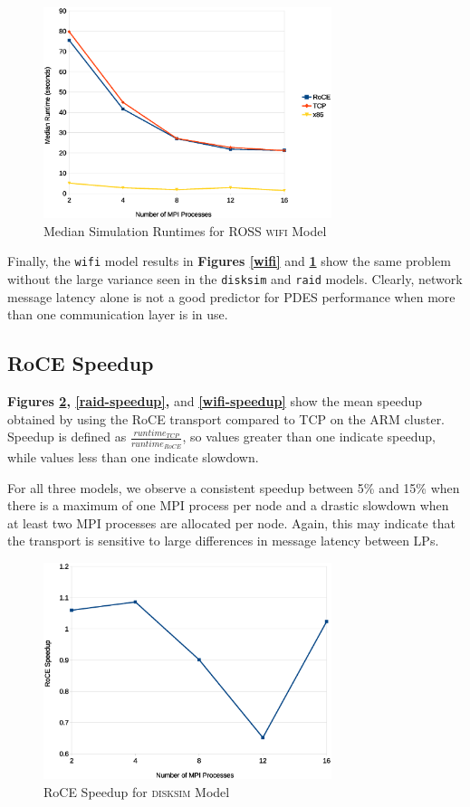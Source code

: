 \documentclass[11pt]{book}
\begin{document}
\begin{figure}
\centering
\includegraphics[width=0.75\textwidth]{wifi_median}
\caption{Median Simulation Runtimes for ROSS \textsc{wifi} Model}
\label{wifi-median}
\end{figure}

Finally, the \verb;wifi; model results in \textbf{Figures \ref{wifi}} and
\textbf{\ref{wifi-median}} show the same problem without the large variance seen
in the \verb;disksim; and \verb;raid; models. Clearly, network message latency
alone is not a good predictor for PDES performance when more than one
communication layer is in use.


\subsection{\textbf{RoCE Speedup}}

\textbf{Figures \ref{disksim-speedup}, \ref{raid-speedup},} and
\textbf{\ref{wifi-speedup}} show the mean speedup obtained by using the RoCE
transport compared to TCP on the ARM cluster. Speedup is defined as
$\frac{runtime_{TCP}}{runtime_{RoCE}}$, so values greater than one indicate speedup,
while values less than one indicate slowdown.

For all three models, we observe a consistent speedup between 5\% and 15\% when
there is a maximum of one MPI process per node and a drastic slowdown when
at least two MPI processes are allocated per node. Again, this may indicate that
the transport is sensitive to large differences in message latency between LPs.

\begin{figure}
\centering
\includegraphics[width=0.75\textwidth]{disksim_speedup}
\caption{RoCE Speedup for \textsc{disksim} Model}
\label{disksim-speedup}
\end{figure}
\end{document}
